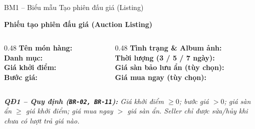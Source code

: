 \documentclass[aspectratio=169, 10pt]{beamer}
\begin{document}
\begin{frame}{BM1 -- Biểu mẫu Tạo phiên đấu giá (Listing)}
    \begin{block}{\centering \textbf{Phiếu tạo phiên đấu giá (Auction Listing)}}
        \vspace{0.15cm}
        \begin{columns}[t]
            \begin{column}{0.48\textwidth}
                \textbf{Tên món hàng:} \hrulefill \\[0.25cm]
                \textbf{Danh mục:} \hrulefill \\[0.25cm]
                \textbf{Giá khởi điểm:} \hrulefill \\[0.25cm]
                \textbf{Bước giá:} \hrulefill
            \end{column}
            \begin{column}{0.48\textwidth}
                \textbf{Tình trạng \& Album ảnh:} \hrulefill \\[0.25cm]
                \textbf{Thời lượng (3 / 5 / 7 ngày):} \hrulefill \\[0.25cm]
                \textbf{Giá sàn bảo lưu ẩn (tùy chọn):} \hrulefill \\[0.25cm]
                \textbf{Giá mua ngay (tùy chọn):} \hrulefill
            \end{column}
        \end{columns}
        \vspace{0.15cm}
    \end{block}
    \vspace{0.25cm}
    \centering
    \textit{\small \textbf{QĐ1 -- Quy định (\texttt{BR-02, BR-11}):} Giá khởi điểm $\ge 0$; bước giá $> 0$; giá sàn ẩn $\ge$ giá khởi điểm; giá mua ngay $>$ giá sàn ẩn. Seller chỉ được sửa/hủy khi chưa có lượt trả giá nào.}
\end{frame}
\end{document}

